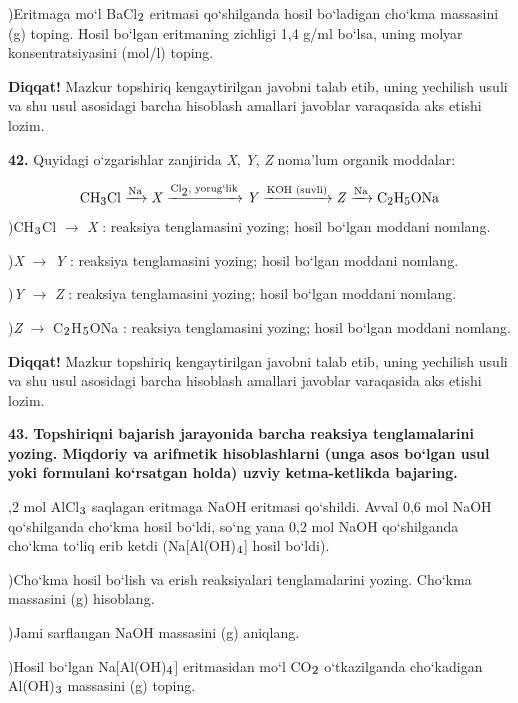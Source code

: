 \documentclass[11pt,a4paper]{article}
\renewcommand{\textsubscript}[1]{\ensuremath{_{\text{\fontsize{8}{8}\selectfont #1}}}}
\newcommand{\diqqat}[1]{\par\smallskip\noindent\textbf{Diqqat!} #1\par\medskip}
\begin{document}
)Eritmaga mo`l BaCl\textsubscript{2} eritmasi qo`shilganda hosil bo`ladigan cho`kma massasini (g) toping. Hosil bo`lgan eritmaning zichligi 1,4 g/ml bo`lsa, uning molyar konsentratsiyasini (mol/l) toping.\par
\diqqat{Mazkur topshiriq kengaytirilgan javobni talab etib, uning yechilish usuli va shu usul asosidagi barcha hisoblash amallari javoblar varaqasida aks etishi lozim.}
\noindent\textbf{42.} Quyidagi o`zgarishlar zanjirida \textit{X}, \textit{Y}, \textit{Z} noma'lum organik moddalar:\par
\[\setlength{\fboxsep}{0pt}\text{CH\textsubscript{3}Cl}\xrightarrow{\text{Na}}\text{\textit{X}}\xrightarrow{\text{Cl\textsubscript{2}, yorug`lik}}\text{\textit{Y}}\xrightarrow{\text{KOH (suvli)}}\text{\textit{Z}}\xrightarrow{\text{Na}}\text{C\textsubscript{2}H\textsubscript{5}ONa}\]
)CH\textsubscript{3}Cl $\to$ \textit{X} : reaksiya tenglamasini yozing; hosil bo`lgan moddani nomlang.\par
{})\textit{X} $\to$ \textit{Y} : reaksiya tenglamasini yozing; hosil bo`lgan moddani nomlang.\par
{})\textit{Y} $\to$ \textit{Z} : reaksiya tenglamasini yozing; hosil bo`lgan moddani nomlang.\par
{})\textit{Z} $\to$ C\textsubscript{2}H\textsubscript{5}ONa : reaksiya tenglamasini yozing; hosil bo`lgan moddani nomlang.\par
\diqqat{Mazkur topshiriq kengaytirilgan javobni talab etib, uning yechilish usuli va shu usul asosidagi barcha hisoblash amallari javoblar varaqasida aks etishi lozim.}
\noindent\textbf{43.} \textbf{Topshiriqni bajarish jarayonida barcha reaksiya tenglamalarini yozing. Miqdoriy va arifmetik hisoblashlarni (unga asos bo`lgan usul yoki formulani ko`rsatgan holda) uzviy ketma-ketlikda bajaring.}\par{},2 mol AlCl\textsubscript{3} saqlagan eritmaga NaOH eritmasi qo`shildi. Avval 0,6 mol NaOH qo`shilganda cho`kma hosil bo`ldi, so`ng yana 0,2 mol NaOH qo`shilganda cho`kma to`liq erib ketdi (Na[Al(OH)\textsubscript{4}] hosil bo`ldi).\par
{})Cho`kma hosil bo`lish va erish reaksiyalari tenglamalarini yozing. Cho`kma massasini (g) hisoblang.\par
{})Jami sarflangan NaOH massasini (g) aniqlang.\par
{})Hosil bo`lgan Na[Al(OH)\textsubscript{4}] eritmasidan mo`l CO\textsubscript{2} o`tkazilganda cho`kadigan Al(OH)\textsubscript{3} massasini (g) toping.\par
\end{document}
